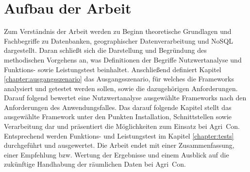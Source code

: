 \section{Aufbau der Arbeit}
Zum Verständnis der Arbeit werden zu Beginn theoretische Grundlagen und Fachbegriffe zu Datenbanken, geographischer Datenverarbeitung und NoSQL dargestellt.
Daran schließt sich die Darstellung und Begründung des methodischen Vorgehens an, was Definitionen der Begriffe Nutzwertanalyse und Funktions- sowie Leistungstest beinhaltet.
Anschließend definiert Kapitel \ref{chapter:ausgangsszenario} das Ausgangsszenario, für welches die Frameworks analysiert und getestet werden sollen, sowie die dazugehörigen Anforderungen.
Darauf folgend bewertet eine Nutzwertanalyse ausgewählte Frameworks nach den Anforderungen des Anwendungsfalles.
Das darauf folgende Kapitel stellt das ausgewählte Framework unter den Punkten Installation, Schnittstellen sowie Verarbeitung dar und präsentiert die Möglichkeiten zum Einsatz bei Agri~Con.
Entsprechend werden Funktions- und Leistungstest im Kapitel \ref{chapter:tests} durchgeführt und ausgewertet.
Die Arbeit endet mit einer Zusammenfassung, einer Empfehlung bzw. Wertung der Ergebnisse und einem Ausblick auf die zukünftige Handhabung der räumlichen Daten bei Agri~Con.


